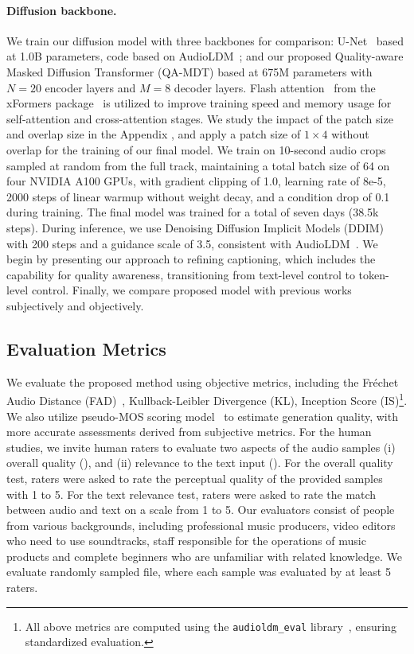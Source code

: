 \paragraph{Diffusion backbone.} We train our diffusion model with three backbones for comparison: U-Net~\citep{ronneberger2015u} based at 1.0B parameters, code based on AudioLDM~\citep{liu2023audioldm}; and our proposed Quality-aware Masked Diffusion Transformer (QA-MDT) based at 675M parameters with \(N=20\) encoder layers and \( M=8 \) decoder layers. Flash attention~\citep{dao2022flashattention} from the xFormers package~\citep{xFormers2022} is utilized to improve training speed and memory usage for self-attention and cross-attention stages. We study the impact of the patch size and overlap size in the Appendix
, and apply a patch size of \(1 \times 4\) without overlap for the training of our final model.
We train on 10-second audio crops sampled at random from the full track, maintaining a total batch size of 64 on four NVIDIA A100 GPUs, with gradient clipping of 1.0, learning rate of 8e-5, 2000 steps of linear warmup without weight decay, and a condition drop of 0.1 during training. The final model was trained for a total of seven days (38.5k steps). During inference, we use Denoising Diffusion Implicit Models (DDIM)~\citep{song2020denoising} with 200 steps and a guidance scale of 3.5, consistent with AudioLDM~\citep{liu2023audioldm}.
\label{sec:res}
We begin by presenting our approach to refining captioning, which includes the capability for quality awareness, transitioning from text-level control to token-level control. Finally, we compare proposed model with previous works
subjectively and objectively.
\subsection{Evaluation Metrics}
We evaluate the proposed method using objective metrics, including the Fréchet Audio Distance (FAD)~\citep{kilgour2018fr}, Kullback-Leibler Divergence (KL), Inception Score (IS)\footnote{All above metrics are computed using the \texttt{audioldm\_eval} library~\citep{liu2023audioldm}, ensuring standardized evaluation.}.
We also utilize pseudo-MOS scoring model~\citep{ragano2023audio} to estimate generation quality, with more accurate assessments derived from subjective metrics.
For the human studies, we invite human raters to evaluate two aspects of the audio samples (i) overall quality (), and (ii) relevance to the text input (). 
For the overall quality test, raters were asked to rate the perceptual quality of the provided samples with 1 to 5. For the text relevance test, raters were asked to rate the match between audio and text on a scale from 1 to 5.
Our evaluators consist of people from various backgrounds, including professional music producers, video editors who need to use soundtracks, staff responsible for the operations of music products and complete beginners who are unfamiliar with related knowledge.
We evaluate randomly sampled file, where each sample was evaluated by at least 5 raters. 

